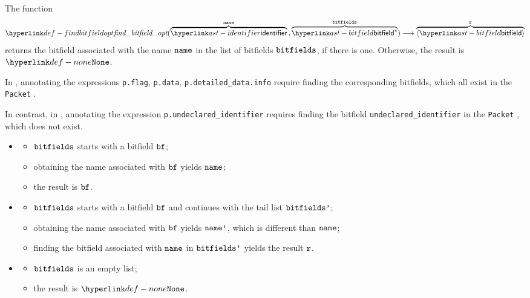\FormallyParagraph
{}

\hypertarget{def-findbitfieldopt}{}
The function
\[
  \findbitfieldopt(\overname{\identifier}{\name} \aslsep \overname{\bitfield^*}{\bitfields})
  \aslto \overname{\langle\bitfield\rangle}{\vr}
\]
returns the bitfield associated with the name $\texttt{name}$ in the list of bitfields $\texttt{bitfields}$,
if there is one. Otherwise, the result is $\None$.

In , annotating the expressions
\verb|p.flag|, \verb|p.data|, \verb|p.detailed_data.info|
require finding the corresponding bitfields, which all exist in the \verb|Packet| \bitvectortypeterm.

In contrast, in , annotating the expression \verb|p.undeclared_identifier|
requires finding the bitfield \verb|undeclared_identifier| in the \verb|Packet| \bitvectortypeterm,
which does not exist.

\ProseParagraph
\OneApplies
\begin{itemize}
  \item {}
  \begin{itemize}
    \item $\texttt{bitfields}$ starts with a bitfield $\texttt{bf}$;
    \item obtaining the name associated with $\texttt{bf}$ yields $\texttt{name}$;
    \item the result is $\texttt{bf}$.
  \end{itemize}

  \item {}
  \begin{itemize}
    \item $\texttt{bitfields}$ starts with a bitfield $\texttt{bf}$ and continues with the tail list $\texttt{bitfields'}$;
    \item obtaining the name associated with $\texttt{bf}$ yields $\texttt{name'}$, which is different than $\texttt{name}$;
    \item finding the bitfield associated with $\texttt{name}$ in $\texttt{bitfields'}$ yields the result $\texttt{r}$.
  \end{itemize}

  \item {}
  \begin{itemize}
    \item $\texttt{bitfields}$ is an empty list;
    \item the result is $\None$.
  \end{itemize}
\end{itemize}

